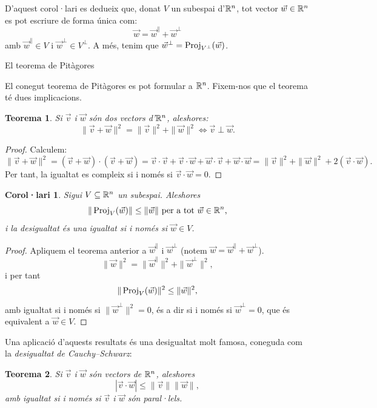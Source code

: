 \documentclass[
  11pt,
]{book}
\makeatletter
\numberwithin{dummy}{section}
\theoremstyle{maincolornumbox}
\newtheorem{theorem}{TTTT}[chapter]
\newtheorem{theoremeT}{Teorema}[chapter]
\theoremstyle{blacknumex}
\theoremstyle{blacknumbox}
\newtheorem{corollaryT}{Corol·lari}[chapter]
\theoremstyle{maincolornum}
\renewenvironment{theorem}{\begin{tBox}\begin{theoremeT}}{\end{theoremeT}\end{tBox}}
\newenvironment{corollary}{\begin{cBox}\begin{corollaryT}}{\end{corollaryT}\end{cBox}}
\renewcommand{\section}{\@startsection{section}{1}{\z@}
{-4ex \@plus -1ex \@minus -.4ex}
{1ex \@plus.2ex }
{\normalfont\large\sffamily\bfseries}}
\newlength\esp
\makeatother
\begin{document}
D'aquest corol·lari es dedueix que, donat \(V\) un subespai d'\(\mathbb{R}^n\), tot
vector \(\vec w\in\mathbb{R}^n\) es pot escriure de forma única com:
\[\vec w = \vec w^\parallel + \vec w^\perp\] amb
\(\vec w^\parallel \in V\) i \(\vec w^\perp \in V^\perp\). A més, tenim que
\(\vec w^\perp=\operatorname{Proj}_{V^\perp}(\vec w)\).

\section{El teorema de Pitàgores}\label{el-teorema-de-pituxe0gores}

El conegut teorema de Pitàgores es pot formular a \(\mathbb{R}^n\). Fixem-nos que
el teorema té dues implicacions.

\begin{theorem}
Si \(\vec v\) i \(\vec w\) són dos vectors d'\(\mathbb{R}^n\), aleshores:
\[\| \vec v + \vec w \|^2 = \|\vec v\|^2 + \|\vec  w\|^2 \iff \vec v \perp \vec w.\]
\end{theorem}

\begin{proof}
Calculem:
\[\| \vec v + \vec w\|^2 = (\vec v+\vec w)\cdot (\vec v+\vec w) = \vec v\cdot \vec v + \vec v\cdot \vec w + \vec w\cdot \vec v + \vec w\cdot \vec w=\|\vec v\|^2 + \|\vec w\|^2 +2(\vec v\cdot \vec w).\]
Per tant, la igualtat es compleix si i només si
\(\vec v\cdot \vec w = 0\).
\end{proof}

\begin{corollary}
Sigui \(V\subseteq \mathbb{R}^n\) un subespai. Aleshores
\[\|\operatorname{Proj}_V(\vec w)\| \leq \| \vec w\| \text{ per a tot $\vec w\in\mathbb{R}^n$,}\]
i la desigualtat és una igualtat si i només si \(\vec w\in V\).
\end{corollary}

\begin{proof}
Apliquem el teorema anterior a \(\vec w^\parallel\) i
\(\vec w^\perp\) (notem \(\vec w = \vec w^\parallel + \vec w^\perp\)).
\[\|\vec w\|^2 = \|\vec w^\parallel\|^2 + \|\vec w^\perp\|^2,\] i per
tant \[\|\operatorname{Proj}_V(\vec w)\|^2 \leq \|\vec w\|^2,\] amb igualtat si i
només si \(\|\vec w^\perp\|^2 = 0\), és a dir si i només si
\(\vec w^\perp = 0\), que és equivalent a \(\vec w\in V\).
\end{proof}

Una aplicació d'aquests resultats és una desigualtat molt famosa,
coneguda com la \emph{desigualtat de Cauchy--Schwarz}:

\begin{theorem}
Si \(\vec v\) i \(\vec w\) són vectors de \(\mathbb{R}^n\), aleshores
\[|\vec v\cdot \vec w|\leq \|\vec v\|\|\vec w\|,\] amb igualtat si i
només si \(\vec v\) i \(\vec w\) són paral·lels.
\end{theorem}
\end{document}

